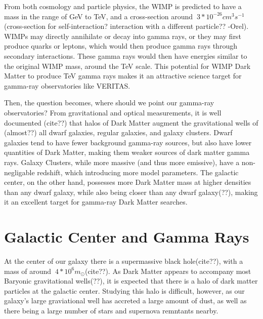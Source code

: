 From both cosmology and particle physics, the WIMP is predicted to have a mass in the range of GeV to TeV, and a cross-section around $~3*10^{-26} cm^{3}s^{-1}$ (cross-section for self-interaction? interaction with a different particle?? -Orel).
WIMPs may directly annihilate or decay into gamma rays, or they may first produce quarks or leptons, which would then produce gamma rays through secondary interactions.
These gamma rays would then have energies similar to the original WIMP mass, around the TeV scale.
This potential for WIMP Dark Matter to produce TeV gamma rays makes it an attractive science target for gamma-ray observatories like VERITAS.

Then, the question becomes, where should we point our gamma-ray observatories?
From gravitational and optical measurements, it is well documented (cite??) that halos of Dark Matter augment the gravitational wells of (almost??) all dwarf galaxies, regular galaxies, and galaxy clusters.
Dwarf galaxies tend to have fewer background gamma-ray sources, but also have lower quantities of Dark Matter, making them weaker sources of dark matter gamma rays.
Galaxy Clusters, while more massive (and thus more emissive), have a non-negligable redshift, which introducing more model parameters.
The galactic center, on the other hand, possesses more Dark Matter mass at higher densities than any dwarf galaxy, while also being closer than any dwarf galaxy(??), making it an excellent target for gamma-ray Dark Matter searches.


\section{Galactic Center and Gamma Rays}

At the center of our galaxy there is a supermassive black hole(cite??), with a mass of around $~4*10^6m_{\odot}$(cite??).
As Dark Matter appears to accompany most Baryonic gravitational wells(??), it is expected that there is a halo of dark matter particles at the galactic center.
Studying this halo is difficult, however, as our galaxy's large graviational well has accreted a large amount of dust, as well as there being a large number of stars and supernova remntants nearby.

